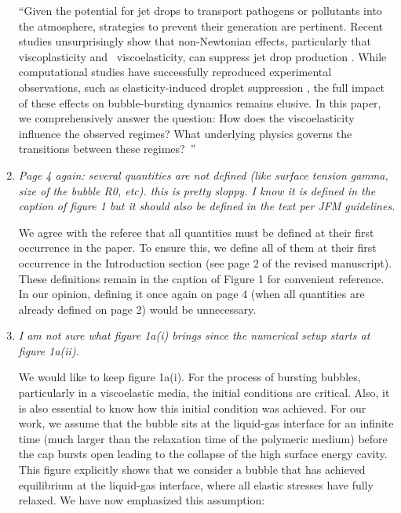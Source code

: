 \documentclass[]{article}
\newcommand{\oo}{\color{magenta} \normalfont}
\newcommand{\bb}{\color{black} \normalfont}
\begin{document}
\begin{enumerate}
	``Given the potential for jet drops to transport pathogens or pollutants into the atmosphere, strategies to prevent their generation are pertinent. Recent studies unsurprisingly show that non-Newtonian effects, particularly that \oo viscoplasticity and\bb\, viscoelasticity, can suppress jet drop production \citep{sanjay2021bursting, sen2021retraction, rodriguez2023bubble, ji2023secondary}.
	While computational studies have successfully reproduced experimental observations, such as elasticity-induced droplet suppression \citep{cabalganteeffect, ari2024bursting}, the full impact of these effects on bubble-bursting dynamics remains elusive. \oo In this paper, we comprehensively answer the question: How does the viscoelasticity influence the observed regimes? What underlying physics governs the transitions between these regimes?\bb\,''

      \item \textit{Page 4 again: several quantities are not defined (like surface tension gamma, size of the bubble R0, etc). this is pretty sloppy. I know it is defined in the caption of figure 1 but it should also be defined in the text per JFM guidelines.}

      We agree with the referee that all quantities must be defined at their first occurrence in the paper. To ensure this, we define all of them at their first occurrence in the Introduction section (see page 2 of the revised manuscript). These definitions remain in the caption of Figure 1 for convenient reference. In our opinion, defining it once again on page 4 (when all quantities are already defined on page 2) would be unnecessary.

      \item \textit{I am not sure what figure 1a(i) brings since the numerical setup starts at figure 1a(ii).}

      We would like to keep figure 1a(i). For the process of bursting bubbles, particularly in a viscoelastic media, the initial conditions are critical. Also, it is also essential to know how this initial condition was achieved. For our work, we assume that the bubble sits at the liquid-gas interface for an infinite time (much larger than the relaxation time of the polymeric medium) before the cap bursts open leading to the collapse of the high surface energy cavity. This figure explicitly shows that we consider a bubble that has achieved equilibrium at the liquid-gas interface, where all elastic stresses have fully relaxed. We have now emphasized this assumption:


\end{enumerate}
\end{document}
